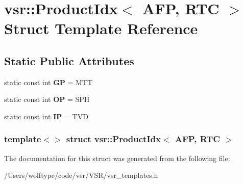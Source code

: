 \hypertarget{structvsr_1_1_product_idx_3_01_a_f_p_00_01_r_t_c_01_4}{\section{vsr\-:\-:Product\-Idx$<$ A\-F\-P, R\-T\-C $>$ Struct Template Reference}
\label{structvsr_1_1_product_idx_3_01_a_f_p_00_01_r_t_c_01_4}
}
\subsection*{Static Public Attributes}
\begin{DoxyCompactItemize}
\item 
\hypertarget{structvsr_1_1_product_idx_3_01_a_f_p_00_01_r_t_c_01_4_a883519eebf07e720d8be3e44d89af45c}{static const int {\bfseries G\-P} = M\-T\-T}\label{structvsr_1_1_product_idx_3_01_a_f_p_00_01_r_t_c_01_4_a883519eebf07e720d8be3e44d89af45c}

\item 
\hypertarget{structvsr_1_1_product_idx_3_01_a_f_p_00_01_r_t_c_01_4_abcef9bc4d8987b397cac0d49aa5226b9}{static const int {\bfseries O\-P} = S\-P\-H}\label{structvsr_1_1_product_idx_3_01_a_f_p_00_01_r_t_c_01_4_abcef9bc4d8987b397cac0d49aa5226b9}

\item 
\hypertarget{structvsr_1_1_product_idx_3_01_a_f_p_00_01_r_t_c_01_4_a8dd9cd79d77cb32c1252f388048c7d7a}{static const int {\bfseries I\-P} = T\-V\-D}\label{structvsr_1_1_product_idx_3_01_a_f_p_00_01_r_t_c_01_4_a8dd9cd79d77cb32c1252f388048c7d7a}

\end{DoxyCompactItemize}
\subsubsection*{template$<$$>$ struct vsr\-::\-Product\-Idx$<$ A\-F\-P, R\-T\-C $>$}



The documentation for this struct was generated from the following file\-:\begin{DoxyCompactItemize}
\item 
/\-Users/wolftype/code/vsr/\-V\-S\-R/vsr\-\_\-templates.\-h\end{DoxyCompactItemize}
